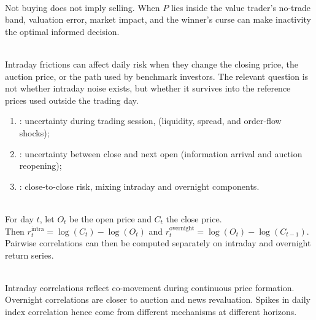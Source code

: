 \begin{caveat} \\
Not buying does not imply selling. When $P$ lies inside the value trader's no-trade band, valuation error, market impact, and the winner's curse can make inactivity the optimal informed decision.
\end{caveat}

\begin{principle} \\
Intraday frictions can affect daily risk when they change the closing price, the auction price, or the path used by benchmark investors. The relevant question is not whether intraday noise exists, but whether it survives into the reference prices used outside the trading day.
\end{principle}

\begin{taxonomy} 
\begin{enumerate}[label=\roman*.]
\setlength{\itemsep}{0pt}
\item {}: uncertainty during trading session, (liquidity, spread, and order-flow shocks);
\item {}: uncertainty between close and next open (information arrival and auction reopening);
\item {}: close-to-close risk, mixing intraday and overnight components.
\end{enumerate}
\end{taxonomy}

\begin{definition} \\
For day $t$, let $O_t$ be the open price and $C_t$ the close price.\\
Then $r_t^{\text{intra}}=\log(C_t)-\log(O_t)$ and $r_t^{\text{overnight}}=\log(O_t)-\log(C_{t-1})$.\\
Pairwise correlations can then be computed separately on intraday and overnight return series.
\end{definition}

\begin{caveat} \\
Intraday correlations reflect co-movement during continuous price formation.\\
Overnight correlations are closer to auction and news revaluation. Spikes in daily index correlation hence come from different mechanisms at different horizons.
\end{caveat}

